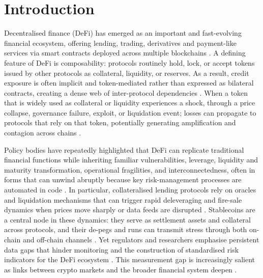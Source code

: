 \section{Introduction}


Decentralised finance (DeFi) has emerged as an important and fast-evolving financial ecosystem, offering lending, trading, derivatives and payment-like services via smart contracts deployed across multiple blockchains \cite{Schar2021DeFi,Gogol2024SoKDeFi}. A defining feature of DeFi is composability: protocols routinely hold, lock, or accept tokens issued by other protocols as collateral, liquidity, or reserves. As a result, credit exposure is often implicit and token-mediated rather than expressed as bilateral contracts, creating a dense web of inter-protocol dependencies \cite{wu2025,Bertomeu2024}. When a token that is widely used as collateral or liquidity experiences a shock, through a price collapse, governance failure, exploit, or liquidation event; losses can propagate to protocols that rely on that token, potentially generating amplification and contagion across chains \cite{Aufiero2025,Gogol2024SoKDeFi}. 

Policy bodies have repeatedly highlighted that DeFi can replicate traditional financial functions while inheriting familiar vulnerabilities, leverage, liquidity and maturity transformation, operational fragilities, and interconnectedness, often in forms that can unwind abruptly because key risk-management processes are automated in code \cite{FSB2023,IOSCO2023DeFi}. In particular, collateralised lending protocols rely on oracles and liquidation mechanisms that can trigger rapid deleveraging and fire-sale dynamics when prices move sharply or data feeds are disrupted \cite{DuleyEtAl2023Oracle,SasiBrodeskyNassr2023DeFiLiquidations,TianZhu2025Liquidations}. Stablecoins are a central node in these dynamics: they serve as settlement assets and collateral across protocols, and their de-pegs and runs can transmit stress through both on-chain and off-chain channels \cite{KosseEtAl2023Stablecoin,AnaduEtAl2023StablecoinsMMF,ESRB2025}. Yet regulators and researchers emphasise persistent data gaps that hinder monitoring and the construction of standardised risk indicators for the DeFi ecosystem \cite{FSB2023,IOSCO2023DeFi}. This measurement gap is increasingly salient as links between crypto markets and the broader financial system deepen \cite{ESRB2025}.

